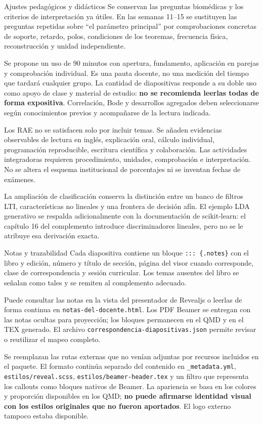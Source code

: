 \documentclass[
  10pt,
  ignorenonframetext,
  aspectratio=169,
  spanish,
]{beamer}
\begin{document}
\begin{frame}{Ajustes pedagógicos y didácticos}
\label{ajustes-pedaguxf3gicos-y-diduxe1cticos}
Se conservan las preguntas biomédicas y los criterios de interpretación
ya útiles. En las semanas 11--15 se sustituyen las preguntas repetidas
sobre ``el parámetro principal'' por comprobaciones concretas de
soporte, retardo, polos, condiciones de los teoremas, frecuencia física,
reconstrucción y unidad independiente.

Se propone un uso de 90 minutos con apertura, fundamento, aplicación en
parejas y comprobación individual. Es una pauta docente, no una medición
del tiempo que tardará cualquier grupo. La cantidad de diapositivas
responde a su doble uso como apoyo de clase y material de estudio:
\textbf{no se recomienda leerlas todas de forma expositiva}.
Correlación, Bode y desarrollos agregados deben seleccionarse según
conocimientos previos y acompañarse de la lectura indicada.

Los RAE no se satisfacen solo por incluir temas. Se añaden evidencias
observables de lectura en inglés, explicación oral, cálculo individual,
programación reproducible, escritura científica y colaboración. Las
actividades integradoras requieren procedimiento, unidades, comprobación
e interpretación. No se altera el esquema institucional de porcentajes
ni se inventan fechas de exámenes.

La ampliación de clasificación conserva la distinción entre un banco de
filtros LTI, características no lineales y una frontera de decisión
afín. El ejemplo LDA generativo se respalda adicionalmente con la
documentación de scikit-learn: el capítulo 16 del complemento introduce
discriminadores lineales, pero no se le atribuye esa derivación exacta.
\end{frame}

\begin{frame}[fragile]{Notas y trazabilidad}
\label{notas-y-trazabilidad}
Cada diapositiva contiene un bloque \texttt{:::\ \{.notes\}} con el
libro y edición, número y título de sección, página del visor cuando
corresponde, clase de correspondencia y sesión curricular. Los temas
ausentes del libro se señalan como tales y se remiten al complemento
adecuado.

Puede consultar las notas en la vista del presentador de Revealjs o
leerlas de forma continua en \texttt{notas-del-docente.html}. Los PDF
Beamer se entregan con las notas ocultas para proyección; los bloques
permanecen en el QMD y en el TEX generado. El archivo
\texttt{correspondencia-diapositivas.json} permite revisar o reutilizar
el mapeo completo.

Se reemplazan las rutas externas que no venían adjuntas por recursos
incluidos en el paquete. El formato continúa separado del contenido en
\texttt{\_metadata.yml}, \texttt{estilos/reveal.scss},
\texttt{estilos/beamer-header.tex} y un filtro que representa los
callouts como bloques nativos de Beamer. La apariencia se basa en los
colores y proporción disponibles en los QMD; \textbf{no puede afirmarse
identidad visual con los estilos originales que no fueron aportados}. El
logo externo tampoco estaba disponible.
\end{frame}
\end{document}
